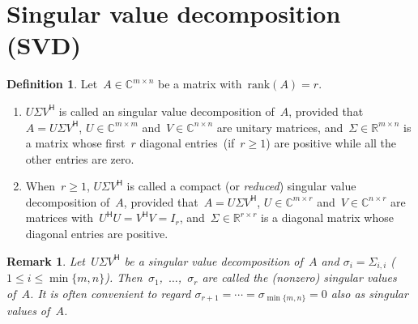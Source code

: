 \documentclass[11pt,a4paper]{article}
\newtheorem{remark}{Remark}%
\theoremstyle{definition}
\newtheorem{definition}{Definition}%
\def\real{\mathbb{R}}
\def\CC{\mathbb{C}}
\newcommand{\hmt}{{\scriptscriptstyle{{\mathsf{H}}}}}
\newcommand{\rank}{\mathrm{rank}}
\begin{document}

\section{Singular value decomposition (SVD)}

\begin{definition}
  \label{def:svd}
  Let~$A\in \CC^{m\times n}$ be a matrix with~$\rank(A) = r$.
  \begin{enumerate}[leftmargin=1.5em]
    \item 
      $U\Sigma V^\hmt$ is called an singular value decomposition of~$A$, 
      provided that~$A = U \Sigma V^\hmt$, $U
      \in \CC^{m\times m}$ and~$V\in\CC^{n\times n}$ are unitary matrices, and~$\Sigma \in
      \real^{m\times n}$ is a matrix whose first~$r$ diagonal entries~(if~$r\ge 1$) are positive
      while all the other entries are zero.
    \item 
      When~$r \ge 1$, $U\Sigma V^\hmt$ is called a compact (or \emph{reduced}) singular value decomposition of~$A$,
      provided that~$A = U \Sigma V^\hmt$, $U \in \CC^{m\times r}$ and~$V\in \CC^{n\times r}$ are matrices
      with~$U^\hmt U = V^\hmt V = I_r$,
      and~$\Sigma \in \real^{r\times r}$ is a diagonal matrix whose diagonal entries are positive.
  \end{enumerate}
\end{definition}

\begin{remark}
  Let~$U\Sigma V^\hmt$ be a singular value decomposition of~$A$ and $\sigma_i = \Sigma_{i,i}$ \textnormal{(}$1\le i\le
  \min\{m,n\}$\textnormal{)}. Then~\mbox{$\sigma_1$, $\dots$, $\sigma_r$} are called the
  \textnormal{(}nonzero\textnormal{)} singular values of~$A$. It is often convenient to 
  regard $\sigma_{r+1}=\cdots=\sigma_{\min\{m,n\}} = 0$ also as singular values of~$A$.
\end{remark}
\end{document}

